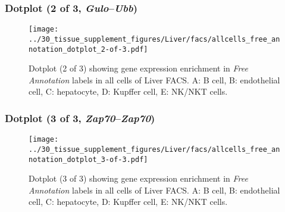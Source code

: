 \clearpage

\subsubsection{Dotplot (2 of 3, \emph{Gulo}--\emph{Ubb})}
\begin{figure}[h]
\centering
\texttt{[image: ../30\_tissue\_supplement\_figures/Liver/facs/allcells\_free\_annotation\_dotplot\_2-of-3.pdf]}

\caption{ Dotplot (2 of 3)  showing gene expression enrichment in \emph{Free Annotation} labels in all cells of Liver FACS. A: B cell, B: endothelial cell, C: hepatocyte, D: Kupffer cell, E: NK/NKT cells.}
\end{figure}


\clearpage

\subsubsection{Dotplot (3 of 3, \emph{Zap70}--\emph{Zap70})}
\begin{figure}[h]
\centering
\texttt{[image: ../30\_tissue\_supplement\_figures/Liver/facs/allcells\_free\_annotation\_dotplot\_3-of-3.pdf]}

\caption{ Dotplot (3 of 3)  showing gene expression enrichment in \emph{Free Annotation} labels in all cells of Liver FACS. A: B cell, B: endothelial cell, C: hepatocyte, D: Kupffer cell, E: NK/NKT cells.}
\end{figure}

